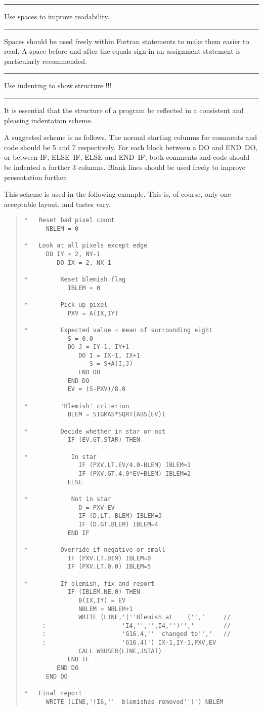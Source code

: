\documentclass[twoside,11pt]{article}
\newcounter{sruleno}
\newcommand{\srule}[1]{
    \addtocounter{sruleno}{1}
    \goodbreak
    \rule[0.5ex]{\textwidth}{0.3mm}
    {\Large #1 \hfill {\thesruleno}}
    \rule[0.5ex]{\textwidth}{0.1mm}
}
\newcommand{\srule}[1]{
       \addtocounter{sruleno}{1}
       \begin{rawhtml} <HR> \end{rawhtml}
       {\Large \thesruleno}~~~~{\Large #1}
       \begin{rawhtml} <HR> \end{rawhtml}
       \end{tabular}
  }
\renewcommand{\_}{{\tt\char'137}}
\begin{document}
\srule{Use spaces to improve readability.}
Spaces should be used freely within Fortran statements
to make them easier to read.  A space before
and after the equals sign in an assignment statement is particularly
recommended.

\srule{Use indenting to show structure !!!}
It is essential that the structure of a program be reflected in a consistent and
pleasing indentation scheme.

A suggested scheme is as follows.
The normal starting columns for comments and code should be 5 and 7
respectively.
For each block between a DO and END~DO, or between IF, ELSE~IF,
ELSE and END~IF, both comments and
code should be indented a further 3 columns.
Blank lines should be used freely to improve presentation further.

\goodbreak
This scheme is used in the following example.  This is, of course,
only one acceptable layout, and tastes vary.
\begin{quote}
\begin{footnotesize}
\begin{verbatim}
*   Reset bad pixel count
      NBLEM = 0

*   Look at all pixels except edge
      DO IY = 2, NY-1
         DO IX = 2, NX-1

*         Reset blemish flag
            IBLEM = 0

*         Pick up pixel
            PXV = A(IX,IY)

*         Expected value = mean of surrounding eight
            S = 0.0
            DO J = IY-1, IY+1
               DO I = IX-1, IX+1
                  S = S+A(I,J)
               END DO
            END DO
            EV = (S-PXV)/8.0

*         'Blemish' criterion
            BLEM = SIGMAS*SQRT(ABS(EV))

*         Decide whether in star or not
            IF (EV.GT.STAR) THEN

*            In star
               IF (PXV.LT.EV/4.0-BLEM) IBLEM=1
               IF (PXV.GT.4.0*EV+BLEM) IBLEM=2
            ELSE

*            Not in star
               D = PXV-EV
               IF (D.LT.-BLEM) IBLEM=3
               IF (D.GT.BLEM) IBLEM=4
            END IF

*         Override if negative or small
            IF (PXV.LT.DIM) IBLEM=0
            IF (PXV.LT.0.0) IBLEM=5

*         If blemish, fix and report
            IF (IBLEM.NE.0) THEN
               B(IX,IY) = EV
               NBLEM = NBLEM+1
               WRITE (LINE,'(''Blemish at    ('','     //
     :                     'I4,'','',I4,'')'','        //
     :                     'G16.4,''  changed to'','   //
     :                     'G16.4)') IX-1,IY-1,PXV,EV
               CALL WRUSER(LINE,JSTAT)
            END IF
         END DO
      END DO

*   Final report
      WRITE (LINE,'(I6,''  blemishes removed'')') NBLEM
\end{verbatim}
\end{footnotesize}
\end{quote}
\end{document}
